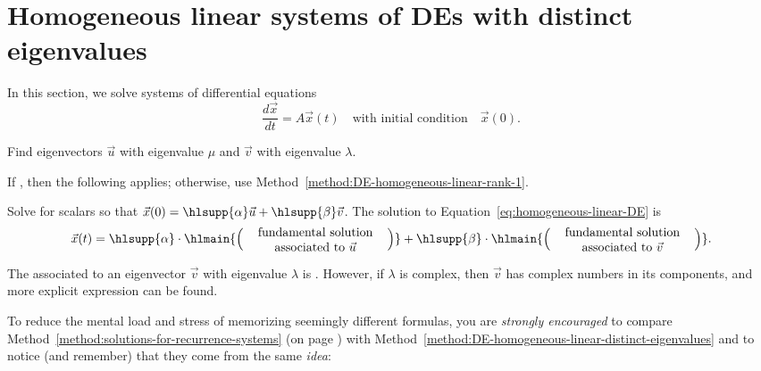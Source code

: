 \documentclass[../main.tex]{subfiles}
\begin{document}
 \section{Homogeneous linear systems of DEs with distinct eigenvalues}
  
In this section, we solve systems of differential equations 
\begin{equation} \label{eq:homogeneous-linear-DE}
  \frac{d\vec{x}}{dt} = A \vec{x}(t) \quad\text{with initial condition}\quad \vec{x}(0).
\end{equation}

\begin{method} \label{method:DE-homogeneous-linear-distinct-eigenvalues}
  Find eigenvectors \(\vec{u}\) with eigenvalue \(\mu\) and \(\vec{v}\) with eigenvalue \(\lambda\).

  If \hlattn{\(\mu \ne \lambda\)}, then the following applies; otherwise, use Method~\ref{method:DE-homogeneous-linear-rank-1}.

  Solve for scalars \hlsupp{\(\alpha, \beta\)} so that \(\vec{x}(0) = \hlsupp{\alpha} \vec{u} + \hlsupp{\beta} \vec{v}\). The solution to Equation~\eqref{eq:homogeneous-linear-DE} is
  \begin{equation} \label{eq:DE-homogeneous-linear-distinct-eigenvalues}
    \vec{x}(t) = \hlsupp{\alpha} \cdot \hlmain{\left( \parbox[c]{1.6in}{\centering fundamental solution associated to \(\vec{u}\)} \right) } + \hlsupp{\beta} \cdot \hlmain{\left( \parbox[c]{1.6in}{\centering fundamental solution associated to \(\vec{v}\)} \right)}.
  \end{equation}

  The  associated to an eigenvector \(\vec{v}\) with eigenvalue \(\lambda\) is .  However, if \(\lambda\) is complex, then \(\vec{v}\) has complex numbers in its components, and more explicit expression can be found.
\end{method}

\faStar{} To reduce the mental load and stress of memorizing seemingly different formulas, you are \emph{strongly encouraged} to compare Method~\ref{method:solutions-for-recurrence-systems} (on page \pageref{eq:solutions-for-recurrence-systems}) with Method~\ref{method:DE-homogeneous-linear-distinct-eigenvalues} and to notice (and remember) that they come from the same \emph{idea}:  
\end{document}
